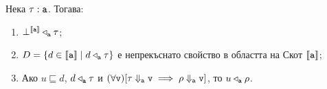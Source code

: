 \begin{lemma}\label{lem:pcf:relation}
  Нека $\tau : \texttt{a}$. Тогава:
  \begin{enumerate}[1)]
  \item
    $\bot^{\llbracket{\texttt{a}}\rrbracket} \triangleleft_{\texttt{a}} \tau$;
  \item
    $D = \{d \in \llbracket{\texttt{a}}\rrbracket \mid d \triangleleft_{\texttt{a}} \tau\}$ е непрекъснато свойство в областта на Скот $\llbracket{\texttt{a}}\rrbracket$;
  \item
    Ако $u \sqsubseteq d$, $d \triangleleft_{\texttt{a}} \tau$ и $(\forall \texttt{v})[\tau \Downarrow_{\texttt{a}} \texttt{v} \implies \rho
    \Downarrow_{\texttt{a}} \texttt{v}]$, то $u \triangleleft_{\texttt{a}} \rho$.
  \end{enumerate}
\end{lemma}
